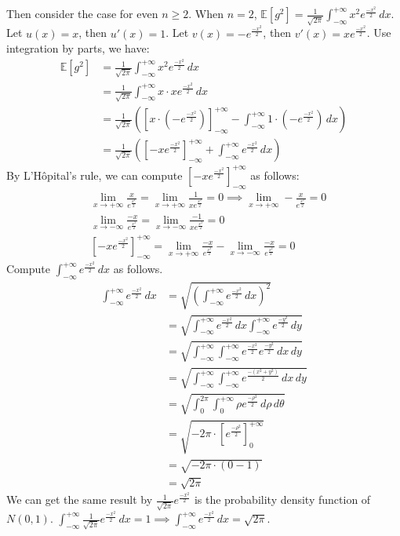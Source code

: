 Then consider the case for even $n \ge 2$.
When $n=2$, $\mathbb{E}[g^2]=\frac{1}{\sqrt{2\pi}}\int_{-\infty }^{+\infty }x^2e^{\frac{-x^2}{2}}\,dx $.
Let $u(x)=x$, then $u'(x)=1$.
Let $v(x)=-e^{\frac{-x^2}{2}}$, then $v'(x)=xe^{\frac{-x^2}{2}}$. Use integration by parts, we have:
\begin{align}
    \nonumber \mathbb{E}[g^2]&=\frac{1}{\sqrt{2\pi}}\int_{-\infty }^{+\infty }x^2e^{\frac{-x^2}{2}}\,dx\\
    \nonumber &=\frac{1}{\sqrt{2\pi}}\int_{-\infty }^{+\infty }x\cdot xe^{\frac{-x^2}{2}}\,dx\\
    \nonumber &=\frac{1}{\sqrt{2\pi}}\left(\left[x\cdot (-e^{\frac{-x^2}{2}})\right]_{-\infty}^{+\infty}-\int_{-\infty }^{+\infty }1\cdot (-e^{\frac{-x^2}{2}})\,dx \right)\\
    \nonumber &=\frac{1}{\sqrt{2\pi}}\left(\left[-xe^{\frac{-x^2}{2}}\right]_{-\infty}^{+\infty}+\int_{-\infty }^{+\infty }e^{\frac{-x^2}{2}}\,dx \right)
\end{align}
By L'Hôpital's rule, we can compute $\left[-xe^{\frac{-x^2}{2}}\right]_{-\infty}^{+\infty}$ as follows:
\begin{align}
    \nonumber &\lim\limits_{x\to+\infty}   \frac{x}{e^{\frac{x^2}{2}}}=  \lim\limits_{x\to+\infty}\frac{1}{xe^{\frac{x^2}{2}}}=0 \implies \lim\limits_{x\to+\infty}   -\frac{x}{e^{\frac{x^2}{2}}}=0\\
    \nonumber &\lim\limits_{x\to-\infty}   \frac{-x}{e^{\frac{x^2}{2}}}=\lim\limits_{x\to-\infty}\frac{-1}{xe^{\frac{x^2}{2}}}=0\\
    \nonumber & \left[-xe^{\frac{-x^2}{2}}\right]_{-\infty}^{+\infty}=\lim\limits_{x\to+\infty}\frac{-x}{e^{\frac{x^2}{2}}}   -\lim\limits_{x\to-\infty} \frac{-x}{e^{\frac{x^2}{2}}}=0
\end{align}
Compute $\int_{-\infty }^{+\infty }e^{\frac{-x^2}{2}}\,dx $ as follows.
\begin{align}
    \nonumber \int_{-\infty }^{+\infty }e^{\frac{-x^2}{2}}\,dx &=\sqrt{(\int_{-\infty }^{+\infty }e^{\frac{-x^2}{2}}\,dx )^2}\\
    \nonumber &=\sqrt{\int_{-\infty }^{+\infty }e^{\frac{-x^2}{2}}\,dx \int_{-\infty }^{+\infty }e^{\frac{-y^2}{2}}\,dy}\\
    \nonumber &=\sqrt{\int_{-\infty }^{+\infty }\int_{-\infty }^{+\infty }e^{\frac{-x^2}{2}}e^{\frac{-y^2}{2}}\,dx\,dy}\\
    \nonumber &=\sqrt{\int_{-\infty }^{+\infty }\int_{-\infty }^{+\infty }e^{\frac{-(x^2+y^2)}{2}}\,dx\,dy}\\
    \nonumber &=\sqrt{\int_{0}^{2\pi}\int_{0 }^{+\infty }\rho e^{\frac{-\rho^2}{2}}\,d\rho\,d\theta }\\
    \nonumber &=\sqrt{-2\pi\cdot\left[e^{\frac{-\rho^2}{2}}\right]_{0}^{+\infty}}\\
    \nonumber &=\sqrt{-2\pi\cdot(0-1)}\\
    \nonumber &=\sqrt{2\pi}
\end{align}
We can get the same result by $\frac{1}{\sqrt{2\pi}}e^{\frac{-x^2}{2}}$ is the probability density function of $N(0,1)$.
$\int_{-\infty }^{+\infty }\frac{1}{\sqrt{2\pi}}e^{\frac{-x^2}{2}}\,dx=1 \implies \int_{-\infty }^{+\infty }e^{\frac{-x^2}{2}}\,dx=\sqrt{2\pi}$.

